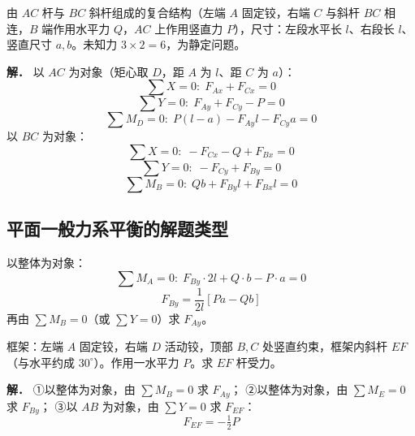\begin{example}[求 $A,B,C$ 三点处约束力]
由 $AC$ 杆与 $BC$ 斜杆组成的复合结构（左端 $A$ 固定铰，右端 $C$ 与斜杆 $BC$ 相连，$B$ 端作用水平力 $Q$，$AC$ 上作用竖直力 $P$），尺寸：左段水平长 $l$、右段长 $l$、竖直尺寸 $a,b$。未知力 $3\times2=6$，为静定问题。

\textbf{解．} 以 $AC$ 为对象（矩心取 $D$，距 $A$ 为 $l$、距 $C$ 为 $a$）：
\begin{equation}
\sum X=0:\;F_{Ax}+F_{Cx}=0
\label{eq:2-例-AC-X}
\end{equation}
\begin{equation}
\sum Y=0:\;F_{Ay}+F_{Cy}-P=0
\label{eq:2-例-AC-Y}
\end{equation}
\begin{equation}
\sum M_D=0:\;P(l-a)-F_{Ay}l-F_{Cy}a=0
\label{eq:2-例-AC-M}
\end{equation}
以 $BC$ 为对象：
\begin{equation}
\sum X=0:\;-F_{Cx}-Q+F_{Bx}=0
\label{eq:2-例-BC-X}
\end{equation}
\begin{equation}
\sum Y=0:\;-F_{Cy}+F_{By}=0
\label{eq:2-例-BC-Y}
\end{equation}
\begin{equation}
\sum M_B=0:\;Qb+F_{By}l+F_{Bx}l=0
\label{eq:2-例-BC-M}
\end{equation}
\end{example}

\subsection{平面一般力系平衡的解题类型}

 以整体为对象：
\begin{equation}
\sum M_A=0:\;F_{By}\cdot2l+Q\cdot b-P\cdot a=0
\label{eq:2-类型1-MA}
\end{equation}
\begin{equation}
F_{By}=\frac{1}{2l}\left[Pa-Qb\right]
\label{eq:2-类型1-FBy}
\end{equation}
再由 $\sum M_B=0$（或 $\sum Y=0$）求 $F_{Ay}$。

\begin{example}[求 $EF$ 杆受力]
框架：左端 $A$ 固定铰，右端 $D$ 活动铰，顶部 $B,C$ 处竖直约束，框架内斜杆 $EF$（与水平约成 $30^\circ$）。作用一水平力 $P$。求 $EF$ 杆受力。

\textbf{解．}
①以整体为对象，由 $\sum M_B=0$ 求 $F_{Ay}$；
②以整体为对象，由 $\sum M_E=0$ 求 $F_{By}$；
③以 $AB$ 为对象，由 $\sum Y=0$ 求 $F_{EF}$：
\begin{equation}
F_{EF}=-\tfrac12 P
\label{eq:2-例-EF}
\end{equation}
\end{example}

